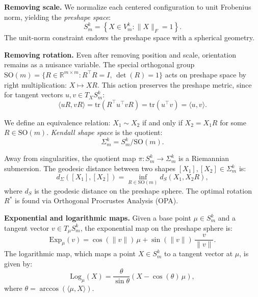 \documentclass{article}
\begin{document}
\textbf{Removing scale.} We normalize each centered configuration to unit Frobenius norm, yielding the \emph{preshape space}:
\begin{equation}
S_m^k = \left\{ X \in V_m^k : \| X \|_F = 1 \right\}.
\end{equation}
The unit-norm constraint endows the preshape space with a spherical geometry.

\textbf{Removing rotation.} Even after removing position and scale, orientation remains as a nuisance variable. The special orthogonal group $\mathrm{SO}(m) = \{ R \in \mathbb{R}^{m \times m} : R^\top R = I,\, \det(R) = 1 \}$ acts on preshape space by right multiplication: $X \mapsto XR$. This action preserves the preshape metric, since for tangent vectors $u, v \in T_X S_m^k$:
\begin{equation}
\langle uR, vR \rangle = \mathrm{tr}(R^\top u^\top v R) = \mathrm{tr}(u^\top v) = \langle u, v \rangle.
\end{equation}

We define an equivalence relation: $X_1 \sim X_2$ if and only if $X_2 = X_1 R$ for some $R \in \mathrm{SO}(m)$. \emph{Kendall shape space} is the quotient:
\begin{equation}
\Sigma_m^k = S_m^k / \mathrm{SO}(m).
\end{equation}

Away from singularities, the quotient map $\pi: S_m^k \to \Sigma_m^k$ is a Riemannian submersion. The geodesic distance between two shapes $[X_1], [X_2] \in \Sigma_m^k$ is:
\begin{equation}
d_\Sigma([X_1], [X_2]) = \inf_{R \in \mathrm{SO}(m)} d_{S}(X_1, X_2 R),
\label{eq:shape_dist}
\end{equation}
where $d_S$ is the geodesic distance on the preshape sphere. The optimal rotation $R^*$ is found via Orthogonal Procrustes Analysis (OPA).

\textbf{Exponential and logarithmic maps.}
Given a base point $\mu \in S_m^k$ and a tangent vector $v \in T_\mu S_m^k$, the exponential map on the preshape sphere is:
\begin{equation}
\mathrm{Exp}_\mu(v) = \cos(\|v\|)\,\mu + \sin(\|v\|)\,\frac{v}{\|v\|}.
\end{equation}
The logarithmic map, which maps a point $X \in S_m^k$ to a tangent vector at $\mu$, is given by:
\begin{equation}
\mathrm{Log}_\mu(X) = \frac{\theta}{\sin \theta}\left(X - \cos(\theta)\,\mu\right),
\end{equation}
where $\theta = \arccos(\langle \mu, X \rangle)$.
\end{document}
